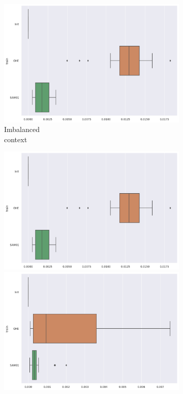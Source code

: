 \documentclass{article}
\theoremstyle{definition}
\begin{document}
\begin{figure}[ht]
\begin{subfigure}[b]{0.15\textwidth}
         \includegraphics[width=\textwidth]{imgs/Illu/1000Epochs/Bal/Boxplots_MSEM.png}
         \caption{Imbalanced \\ context}
         \label{MSEM_Imb_X}
     \end{subfigure}
     \begin{subfigure}[b]{0.15\textwidth}
         \centering
         \includegraphics[width=\textwidth]{imgs/Illu/1000Epochs/Bal/Boxplots_MSEM.png}
         \quad
         \includegraphics[width=\textwidth]{imgs/Illu/2000Epochs/Bal/Boxplots_MSEM.png}

\end{subfigure}
\end{figure}
\end{document}
